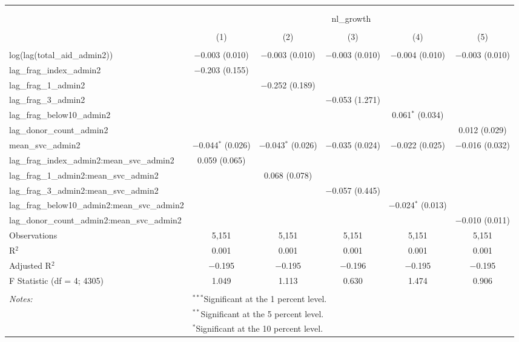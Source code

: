 
\begin{table}[!htbp] \centering 
  \caption{} 
  \label{} 
\begin{tabular}{@{\extracolsep{2pt}}lccccc} 
\\[-1.8ex]\hline 
\hline \\[-1.8ex] 
\\[-1.8ex] & \multicolumn{5}{c}{nl\_growth} \\ 
\\[-1.8ex] & (1) & (2) & (3) & (4) & (5)\\ 
\hline \\[-1.8ex] 
 log(lag(total\_aid\_admin2)) & $-$0.003 (0.010) & $-$0.003 (0.010) & $-$0.003 (0.010) & $-$0.004 (0.010) & $-$0.003 (0.010) \\ 
  lag\_frag\_index\_admin2 & $-$0.203 (0.155) &  &  &  &  \\ 
  lag\_frag\_1\_admin2 &  & $-$0.252 (0.189) &  &  &  \\ 
  lag\_frag\_3\_admin2 &  &  & $-$0.053 (1.271) &  &  \\ 
  lag\_frag\_below10\_admin2 &  &  &  & 0.061$^{*}$ (0.034) &  \\ 
  lag\_donor\_count\_admin2 &  &  &  &  & 0.012 (0.029) \\ 
  mean\_svc\_admin2 & $-$0.044$^{*}$ (0.026) & $-$0.043$^{*}$ (0.026) & $-$0.035 (0.024) & $-$0.022 (0.025) & $-$0.016 (0.032) \\ 
  lag\_frag\_index\_admin2:mean\_svc\_admin2 & 0.059 (0.065) &  &  &  &  \\ 
  lag\_frag\_1\_admin2:mean\_svc\_admin2 &  & 0.068 (0.078) &  &  &  \\ 
  lag\_frag\_3\_admin2:mean\_svc\_admin2 &  &  & $-$0.057 (0.445) &  &  \\ 
  lag\_frag\_below10\_admin2:mean\_svc\_admin2 &  &  &  & $-$0.024$^{*}$ (0.013) &  \\ 
  lag\_donor\_count\_admin2:mean\_svc\_admin2 &  &  &  &  & $-$0.010 (0.011) \\ 
 Observations & 5,151 & 5,151 & 5,151 & 5,151 & 5,151 \\ 
R$^{2}$ & 0.001 & 0.001 & 0.001 & 0.001 & 0.001 \\ 
Adjusted R$^{2}$ & $-$0.195 & $-$0.195 & $-$0.196 & $-$0.195 & $-$0.195 \\ 
F Statistic (df = 4; 4305) & 1.049 & 1.113 & 0.630 & 1.474 & 0.906 \\ 
\hline \\[-1.8ex] 
\textit{Notes:} & \multicolumn{5}{l}{$^{***}$Significant at the 1 percent level.} \\ 
 & \multicolumn{5}{l}{$^{**}$Significant at the 5 percent level.} \\ 
 & \multicolumn{5}{l}{$^{*}$Significant at the 10 percent level.} \\ 
\end{tabular} 
\end{table} 
